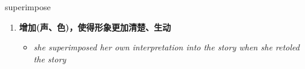 
\begin{frame}
{\huge superimpose}
\begin{center}
\begin{enumerate}\Large
  \item \textbf{增加(声、色)，使得形象更加清楚、生动}
  \begin{itemize}
    \item \em{\Large{she superimposed her own interpretation into the story when she retoled the story}}
  \end{itemize}
\end{enumerate}
\end{center}
\end{frame}
